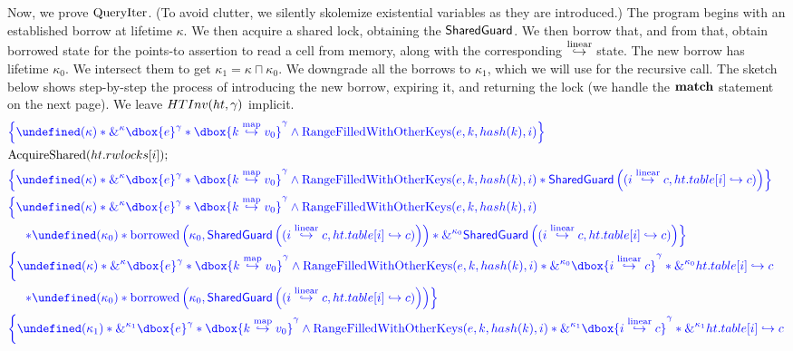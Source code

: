 \documentclass{article}
\DeclareMathOperator{\RangeFilledWithOtherKeys}{RangeFilledWithOtherKeys}
\newcommand\dboxed[1]{\dbox{\vphantom{t}\ensuremath{#1}}}
\newcommand{\borrow}[2]{\textsc{\&}^{#1}#2}
\newcommand{\pointsto}{\hookrightarrow}
\newcommand{\ltIntersect}{\sqcap}
\DeclareMathOperator{\borrowed}{borrowed}
\let\active\undefined
\DeclareMathOperator{\active}{active}
\begin{document}
Now, we prove $\text{QueryIter}$. (To avoid clutter, we silently skolemize existential
variables as they are introduced.)
The program begins with an established borrow at lifetime $\kappa$.
We then acquire a shared lock, obtaining the $\textsf{SharedGuard}$.
We then borrow that, and from that, obtain borrowed state for the points-to assertion to read a cell from memory,
along with the corresponding $\stackrel{\text{linear}}{\hookrightarrow}$ state.
The new borrow has lifetime $\kappa_0$. We intersect them to get $\kappa_1 = \kappa \ltIntersect \kappa_0$. We downgrade
all the borrows to $\kappa_1$, which we will use for the recursive call. The sketch below shows step-by-step the process
of introducing the new borrow, expiring it, and returning the lock (we handle the $\textbf{match}$ statement on the next page).
We leave $HTInv(ht,\gamma)$ implicit.
\begin{align*}
  &\inlinehoare{\active(\kappa) * \borrow{\kappa}{\dboxed{e}^\gamma}
      * \dboxed{k \hashto v_0}^\gamma \land \RangeFilledWithOtherKeys(e, k, \hash(k), i)}\\
  &\AcquireShared(ht.rwlocks[i]);\\
  &\inlinehoare{\active(\kappa) * \borrow{\kappa}{\dboxed{e}^\gamma}
      * \dboxed{k \hashto v_0}^\gamma \land \RangeFilledWithOtherKeys(e, k, \hash(k), i)
      * \SharedGuard\left( (i \entryto c, ht.table[i] \pointsto c) \right) }\\
  &\inlinehoarel{\active(\kappa) * \borrow{\kappa}{\dboxed{e}^\gamma}
      * \dboxed{k \hashto v_0}^\gamma \land \RangeFilledWithOtherKeys(e, k, \hash(k), i)}\\
  &\inlinehoarer{~~~~
      * \active(\kappa_0) * \borrowed\left(\kappa_0, \SharedGuard\left( (i \entryto c, ht.table[i] \pointsto c) \right) \right)
      * \borrow{\kappa_0}{\SharedGuard\left( (i \entryto c, ht.table[i] \pointsto c) \right) }}\\
  &\inlinehoarel{\active(\kappa) * \borrow{\kappa}{\dboxed{e}^\gamma}
      * \dboxed{k \hashto v_0}^\gamma \land \RangeFilledWithOtherKeys(e, k, \hash(k), i) * \borrow{\kappa_0}{\dboxed{i\entryto c}^\gamma} * \borrow{\kappa_0}{ht.table[i] \pointsto c}}\\
  &\inlinehoarer{~~~~
      * \active(\kappa_0) * \borrowed\left(\kappa_0, \SharedGuard\left( (i \entryto c, ht.table[i] \pointsto c) \right) \right) }\\
  &\inlinehoarel{\active(\kappa_1) * \borrow{\kappa_1}{\dboxed{e}^\gamma}
      * \dboxed{k \hashto v_0}^\gamma \land \RangeFilledWithOtherKeys(e, k, \hash(k), i) * \borrow{\kappa_1}{\dboxed{i\entryto c}^\gamma} * \borrow{\kappa_1}{ht.table[i] \pointsto c}}\\

\end{align*}
\end{document}
